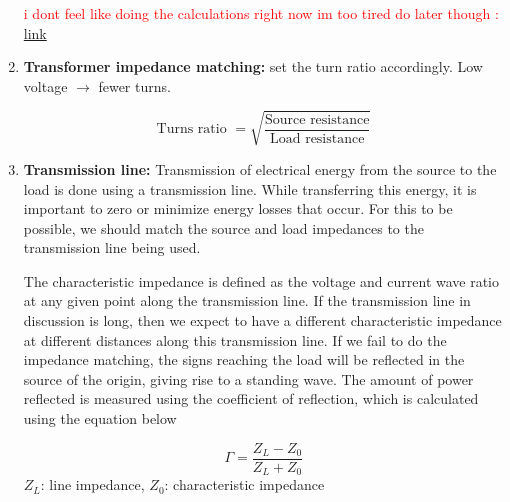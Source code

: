 \begin{enumerate}
    \textcolor{red}{i dont feel like doing the calculations right now im too tired do later though : \href{https://eepower.com/technical-articles/understanding-impedance-matching}{link}}

    \item \textbf{Transformer impedance matching:} set the turn ratio accordingly. Low voltage $\rightarrow$ fewer turns. 
        \begin{define}
            \[\text{Turns ratio }= \sqrt{\frac{\text{Source resistance}}{\text{Load resistance}}}\]
        \end{define}
    
    \item \textbf{Transmission line:} Transmission of electrical energy from the source to the load is done using a transmission line. While transferring this energy, it is important to zero or minimize energy losses that occur. For this to be possible, we should match the source and load impedances to the transmission line being used.
    
    The characteristic impedance is defined as the voltage and current wave ratio at any given point along the transmission line. If the transmission line in discussion is long, then we expect to have a different characteristic impedance at different distances along this transmission line. If we fail to do the impedance matching, the signs reaching the load will be reflected in the source of the origin, giving rise to a standing wave. The amount of power reflected is measured using the coefficient of reflection, which is calculated using the equation below
        \begin{define}
            \[\Gamma  = \frac{Z_L - Z_0}{Z_L + Z_0}\]
            $Z_L$: line impedance, $Z_0$: characteristic impedance
        \end{define}


\end{enumerate}
